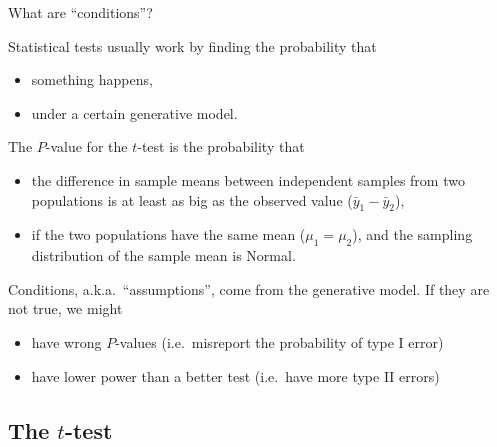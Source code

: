 \begin{frame}{What are ``conditions''?}

  Statistical tests usually work by finding the probability that 
  \begin{itemize}
    \item something happens,
    \item under a certain generative model.
  \end{itemize}

  \vspace{2em}

   The $P$-value for the $t$-test is the probability that 
  \begin{itemize}
    \item the difference in sample means between independent samples from two populations is at least as big as the observed value ($\bar y_1 - \bar y_2$), 
    \item if the two populations have the same mean ($\mu_1 = \mu_2$), and the sampling distribution of the sample mean is Normal.
  \end{itemize}

  \vspace{2em}
  
  \alert{Conditions}, a.k.a.\ ``assumptions'', come from the generative model.
  If they are not true, we might
  \begin{itemize}
    \item have \alert{wrong} $P$-values (i.e.\ misreport the probability of type I error)
    \item {} have lower power than a better test (i.e.\ have more type II errors)
  \end{itemize}

\end{frame}

\subsection{The $t$-test}

